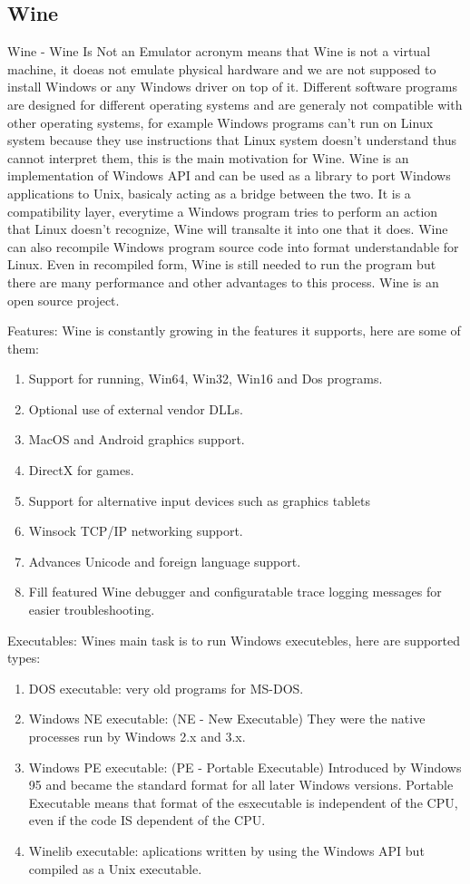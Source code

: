 \begin{itemize}
\section{Wine}
Wine - Wine Is Not an Emulator acronym means that Wine is not a virtual machine, it doeas not emulate physical hardware and we are not supposed to install Windows or any Windows driver on top of it. Different software programs are designed for different operating systems and are generaly not compatible with other operating systems, for example Windows programs can't run on Linux system because they use instructions that Linux system doesn't understand thus cannot interpret them, this is the main motivation for Wine. Wine is an implementation of Windows API and can be used as a library to port Windows applications to Unix, basicaly acting as a bridge between the two. It is a compatibility layer, everytime a Windows program tries to perform an action that Linux doesn't recognize, Wine will transalte it into one that it does. Wine can also recompile Windows program source code into format understandable for Linux. Even in recompiled form, Wine is still needed to run the program but there are many performance and other advantages to this process. Wine is an open source project.

Features:
Wine is constantly growing in the features it supports, here are some of them:
\begin{enumerate}
\item Support for running, Win64, Win32, Win16 and Dos programs.
\item Optional use of external vendor DLLs.
\item MacOS and Android graphics support.
\item DirectX for games.
\item Support for alternative input devices such as graphics tablets
\item Winsock TCP/IP networking support.
\item Advances Unicode and foreign language support.
\item Fill featured Wine debugger and configuratable trace logging messages for easier troubleshooting.
\end{enumerate}

Executables:
Wines main task is to run Windows executebles, here are supported types:
\begin{enumerate}
\item DOS executable: very old programs for MS-DOS.
\item Windows NE executable: (NE - New Executable) They were the native processes run by Windows 2.x and 3.x.
\item Windows PE executable: (PE - Portable Executable) Introduced by Windows 95 and became the standard format for all later Windows versions. Portable Executable means that format of the esxecutable is independent of the CPU, even if the code IS dependent of the CPU.
\item Winelib executable: aplications written by using the Windows API but compiled as a Unix executable.
\end{enumerate}


\end{itemize}
